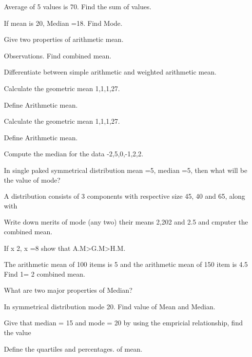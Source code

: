 \documentclass[11pt,a4paper]{article}
\begin{document}
\begin{shortlist}
\item Average of 5 values is 70. Find the sum of values.

\item If mean is 20, Median =18. Find Mode.

\item Give two properties of arithmetic mean.

\item Observations. Find combined mean.

\item Differentiate between simple arithmetic and weighted arithmetic mean.

\item Calculate the geometric mean 1,1,1,27.

\item Define Arithmetic mean.

\item Calculate the geometric mean 1,1,1,27.

\item Define Arithmetic mean.

\item Compute the median for the data -2,5,0,-1,2,2.

\item In single paked symmetrical distribution mean =5, median =5, then what will be the value of mode?

\item A distribution consists of 3 components with respective size 45, 40 and 65, along with

\item Write down merits of mode (any two) their means 2,202 and 2.5 and cmputer the combined mean.

\item If x 2, x =8 show that A.M>G.M>H.M.

\item The arithmetic mean of 100 items is 5 and the arithmetic mean of 150 item is 4.5 Find 1= 2 combined mean.

\item What are two major properties of Median?

\item In symmetrical distribution mode 20. Find value of Mean and Median.

\item Give that median = 15 and mode = 20 by using the empricial relationship, find the value

\item Define the quartiles and percentages. of mean.


\end{shortlist}
\end{document}
